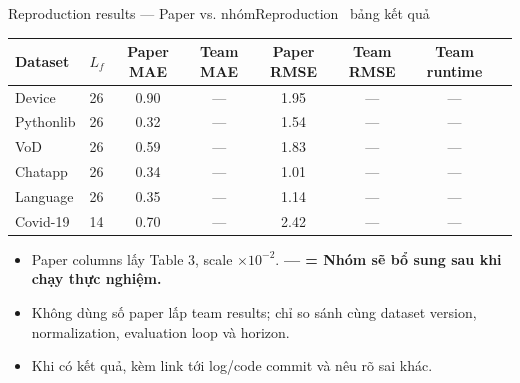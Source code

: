 \begin{frame}[shrink=19]{Reproduction results --- Paper vs. nhóm}{Reproduction \textperiodcentered\ bảng kết quả}
\centering
{\small
\begin{tabular}{@{}llcccccc@{}}
  \toprule
  Dataset & $L_f$ & Paper MAE & Team MAE & Paper RMSE & Team RMSE & Team runtime\\
  \midrule
  Device & 26 & 0.90 & --- & 1.95 & --- & ---\\
  Pythonlib & 26 & 0.32 & --- & 1.54 & --- & ---\\
  VoD & 26 & 0.59 & --- & 1.83 & --- & ---\\
  Chatapp & 26 & 0.34 & --- & 1.01 & --- & ---\\
  Language & 26 & 0.35 & --- & 1.14 & --- & ---\\
  Covid-19 & 14 & 0.70 & --- & 2.42 & --- & ---\\
  \bottomrule
\end{tabular}}
\vspace{5mm}
\begin{itemize}
  \item Paper columns lấy Table 3, scale $\times10^{-2}$. \textbf{--- = Nhóm sẽ bổ sung sau khi chạy thực nghiệm.}
  \item Không dùng số paper lấp team results; chỉ so sánh cùng dataset version, normalization, evaluation loop và horizon.
  \item Khi có kết quả, kèm link tới log/code commit và nêu rõ sai khác.
\end{itemize}
\vspace{3mm}
\end{frame}

